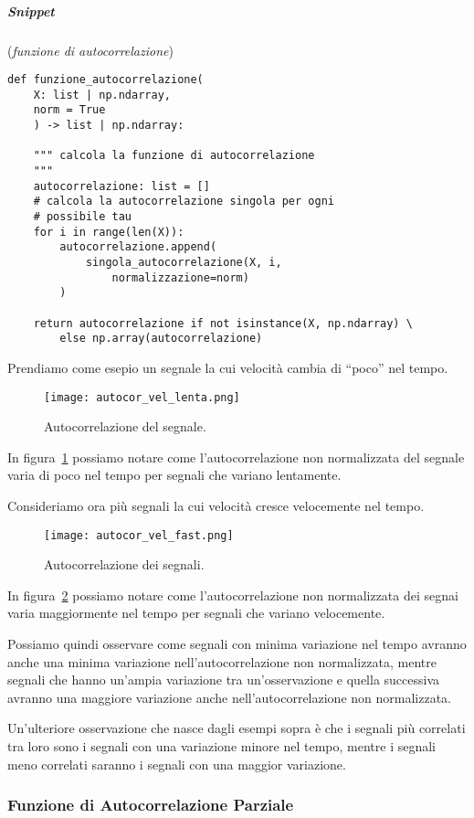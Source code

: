\subparagraph*{Snippet} (\textit{funzione di autocorrelazione})
\begin{verbatim}
def funzione_autocorrelazione(
    X: list | np.ndarray,
    norm = True
    ) -> list | np.ndarray:
    
    """ calcola la funzione di autocorrelazione
    """
    autocorrelazione: list = []
    # calcola la autocorrelazione singola per ogni
    # possibile tau
    for i in range(len(X)):
        autocorrelazione.append(
            singola_autocorrelazione(X, i, 
                normalizzazione=norm)
        )

    return autocorrelazione if not isinstance(X, np.ndarray) \
        else np.array(autocorrelazione)
\end{verbatim}

\begin{esempio}[Autocorrelazione]
    Prendiamo come esepio un segnale la cui velocità cambia di ``poco''
    nel tempo.

    \begin{figure}[H]
        \centering
        \texttt{[image: autocor\_vel\_lenta.png]}
        \caption{Autocorrelazione del segnale.}
        \label{fig:autcor_slow}
    \end{figure}

    In figura~\ref{fig:autcor_slow} possiamo notare come l'autocorrelazione non normalizzata
    del segnale varia di poco nel tempo per segnali che variano lentamente.

    Consideriamo ora più segnali la cui velocità cresce velocemente nel tempo.

    \begin{figure}[H]
        \centering
        \texttt{[image: autocor\_vel\_fast.png]}
        \caption{Autocorrelazione dei segnali.}
        \label{fig:autcor_fast}
    \end{figure}

    In figura~\ref{fig:autcor_fast} possiamo notare come l'autocorrelazione non normalizzata
    dei segnai varia maggiormente nel tempo per segnali che variano velocemente.

    Possiamo quindi osservare come segnali con minima variazione nel tempo avranno anche
    una minima variazione nell'autocorrelazione non normalizzata, mentre segnali che hanno
    un'ampia variazione tra un'osservazione e quella successiva avranno una maggiore variazione 
    anche nell'autocorrelazione non normalizzata.

    Un'ulteriore osservazione che nasce dagli esempi sopra è che i segnali più 
    correlati tra loro sono i segnali con una variazione minore nel tempo, mentre
    i segnali meno correlati saranno i segnali con una maggior variazione. 

\end{esempio}


\subsubsection{Funzione di Autocorrelazione Parziale}